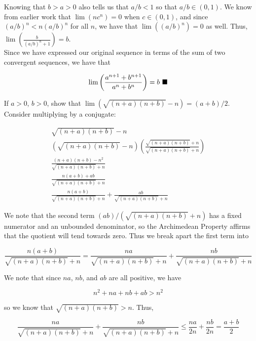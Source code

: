 \documentclass[paper=a4, fontsize=11pt]{scrartcl} %
\numberwithin{equation}{section} %
\numberwithin{figure}{section} %
\numberwithin{table}{section} %
\begin{document}
Knowing that $b > a > 0$ also tells us that $a/b < 1$ so that $a/b \in (0,1)$. We know from earlier work that $\lim(nc^n) = 0$ when $c \in (0,1)$, and since $(a/b)^n < n(a/b)^n$ for all $n$, we have that $\lim((a/b)^n) = 0$ as well. Thus, $\lim(\frac{b}{(a/b)^n + 1}) = b$.\\

Since we have expressed our original sequence in terms of the sum of two convergent sequences, we have that 

\begin{equation*}
\lim\left(\frac{a^{n+1} + b^{n+1}}{a^n + b^n}\right) = b ~ \blacksquare
\end{equation*}

 If $a > 0$, $b > 0$, show that $\lim\left(\sqrt{(n+a)(n+b)} - n\right) = (a + b)/2$.
\pf Consider multiplying by a conjugate:

\begin{gather*}
\sqrt{(n+a)(n+b)} - n \\
(\sqrt{(n+a)(n+b)} - n)\left(\frac{\sqrt{(n+a)(n+b)} + n}{\sqrt{(n+a)(n+b)} + n}\right)\\ 
\frac{(n+a)(n+b) - n^2}{\sqrt{(n+a)(n+b)} + n}\\ 
\frac{n(a+b) + ab}{\sqrt{(n+a)(n+b)} + n}\\
\frac{n(a+b)}{\sqrt{(n+a)(n+b)} + n} + \frac{ab}{\sqrt{(n+a)(n+b)} + n}
\end{gather*}

We note that the second term $(ab)/(\sqrt{(n+a)(n+b)} + n)$ has a fixed numerator and an unbounded denominator, so the Archimedean Property affirms that the quotient will tend towards zero. Thus we break apart the first term into

\begin{equation*}
\frac{n(a+b)}{\sqrt{(n+a)(n+b)} + n} = \frac{na}{\sqrt{(n+a)(n+b)} + n} + \frac{nb}{\sqrt{(n+a)(n+b)} + n}
\end{equation*}

We note that since $na$, $nb$, and $ab$ are all positive, we have

\begin{equation*}
n^2 + na + nb + ab > n^2
\end{equation*}

so we know that $\sqrt{(n+a)(n+b)} > n$. Thus,

\begin{equation*}
\frac{na}{\sqrt{(n+a)(n+b)} + n} + \frac{nb}{\sqrt{(n+a)(n+b)} + n} \leq \frac{na}{2n} + \frac{nb}{2n} = \frac{a + b}{2}
\end{equation*}
\end{document}
